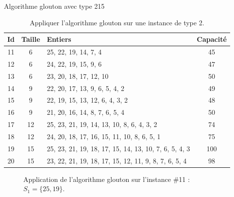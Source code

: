 \begin{exercice}[label=ex:GS2]{Algorithme glouton avec type 2}{15}

\begin{table}[H]
\centering
\begin{tabular}{cclc}
  \toprule
Id & Taille & Entiers & Capacité \\
  \midrule
 11 &   6 & 25, 22, 19, 14, 7, 4 &  45 \\
   12 &   6 & 24, 22, 19, 15, 9, 6 &  47 \\
   13 &   6 & 23, 20, 18, 17, 12, 10 &  50 \\
   14 &   9 & 22, 20, 17, 13, 9, 6, 5, 4, 2 &  49 \\
   15 &   9 & 22, 19, 15, 13, 12, 6, 4, 3, 2 &  48 \\
   16 &   9 & 21, 20, 16, 14, 8, 7, 6, 5, 4 &  50 \\
   17 &  12 & 25, 23, 21, 19, 14, 13, 10, 8, 6, 4, 3, 2 &  74 \\
   18 &  12 & 24, 20, 18, 17, 16, 15, 11, 10, 8, 6, 5, 1 &  75 \\
   19 &  15 & 25, 23, 21, 19, 18, 17, 15, 14, 13, 10, 7, 6, 5, 4, 3 & 100 \\
   20 &  15 & 23, 22, 21, 19, 18, 17, 15, 12, 11, 9, 8, 7, 6, 5, 4 &  98 \\
   \bottomrule
\end{tabular}
\caption{Appliquer l'algorithme glouton sur une instance de type 2.}
\label{tab:GS2}
\end{table}

\end{exercice}

\begin{figure}[htbp]
\centering
{}
\caption{Application de l'algorithme glouton sur l'instance \#11 : $S_1 = \{25,19\}$.}
\label{fig:GS2-11}
\end{figure}

